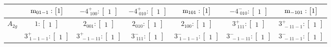 \documentclass[fleqn,8pt,landscape]{jsarticle}
\begin{document}
\begin{longtable}{ccccccc}
& $ {\rm m}_{01-1}:\begin{bmatrix} 1 \end{bmatrix} $ & $ -4^{+}_{\,\,100}:\begin{bmatrix} 1 \end{bmatrix} $ & $ -4^{+}_{\,\,010}:\begin{bmatrix} 1 \end{bmatrix} $ & $ {\rm m}_{101}:\begin{bmatrix} 1 \end{bmatrix} $ & $ -4^{-}_{\,\,010}:\begin{bmatrix} 1 \end{bmatrix} $ & $ {\rm m}_{-101}:\begin{bmatrix} 1 \end{bmatrix} $ \\ \hline
$ A_{2g} $ & $ 1:\begin{bmatrix} 1 \end{bmatrix} $ & $ 2{}_{001}:\begin{bmatrix} 1 \end{bmatrix} $ & $ 2{}_{010}:\begin{bmatrix} 1 \end{bmatrix} $ & $ 2{}_{100}:\begin{bmatrix} 1 \end{bmatrix} $ & $ 3^{+}_{\,\,111}:\begin{bmatrix} 1 \end{bmatrix} $ & $ 3^{+}_{\,\,-11-1}:\begin{bmatrix} 1 \end{bmatrix} $ \\
& $ 3^{+}_{\,\,1-1-1}:\begin{bmatrix} 1 \end{bmatrix} $ & $ 3^{+}_{\,\,-1-11}:\begin{bmatrix} 1 \end{bmatrix} $ & $ 3^{-}_{\,\,111}:\begin{bmatrix} 1 \end{bmatrix} $ & $ 3^{-}_{\,\,1-1-1}:\begin{bmatrix} 1 \end{bmatrix} $ & $ 3^{-}_{\,\,-1-11}:\begin{bmatrix} 1 \end{bmatrix} $ & $ 3^{-}_{\,\,-11-1}:\begin{bmatrix} 1 \end{bmatrix} $ \\

\end{longtable}
\end{document}

